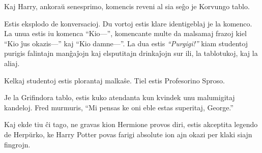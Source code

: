 Kaj Harry, ankoraŭ senesprimo, komencis reveni al sia seĝo je Korvungo tablo.

Estis eksplodo de konversacioj. Du vortoj estis klare identigeblaj je
la komenco. La unua estis iu komenca ``Kio—'', komencante multe da
malsamaj frazoj kiel ``Kio ĵus okazis—'' kaj ``Kio damne—''. La dua
estis \emph{``Purgigi!''} kiam studentoj purigis falintajn manĝaĵojn
kaj elsputitajn drinkaĵojn sur ili, la tablotukoj, kaj la aliaj.

Kelkaj studentoj estis plorantaj malkaŝe. Tiel estis Profesorino Sproso.

Je la Grifindora tablo, estis kuko atendanta kun kvindek unu
malumigitaj kandeloj. Fred murmuris, ``Mi pensas ke oni eble estas
superitaj, George.''

Kaj ekde tiu ĉi tago, ne gravas kion Hermione provos diri, estis
akceptita legendo de Herpŭrko, ke Harry Potter povas farigi absolute
ion ajn okazi per klaki siajn fingrojn.
